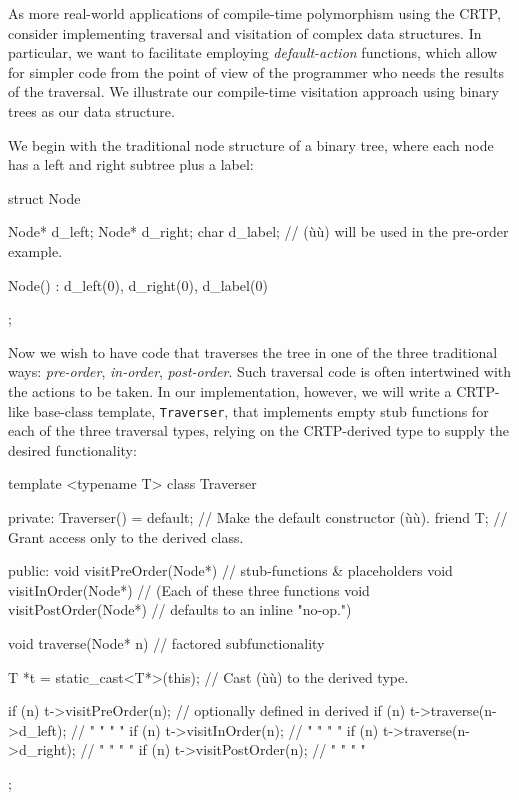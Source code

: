 As more real-world applications of compile-time polymorphism using the CRTP,
consider implementing traversal and visitation of complex data
structures. In particular, we want to facilitate employing
\emph{default-action} functions, which allow for simpler code from the
point of view of the programmer who needs the results of the traversal.
We illustrate our compile-time visitation approach using binary trees as
our data structure.

We begin with the traditional node structure of a binary tree, where
each node has a left and right subtree plus a label:

\begin{emcppslisting}[emcppsbatch=e9]
struct Node
{
    Node* d_left;
    Node* d_right;
    char  d_label;  // (ù{}ù) will be used in the pre-order example.

    Node() : d_left(0), d_right(0), d_label(0) { }
};
\end{emcppslisting}

\noindent Now we wish to have code that traverses the tree in one of the three
traditional ways: \emph{pre-order}, \emph{in-order}, \emph{post-order}.
Such traversal code is often intertwined with the actions to be taken.
In our implementation, however, we will write a CRTP-like base-class
template, \lstinline!Traverser!, that implements empty stub functions for
each of the three traversal types, relying on the CRTP-derived
type to supply the desired functionality:

\begin{emcppslisting}[emcppsbatch=e9]
template <typename T>
class Traverser
{
private:
    Traverser() = default;  // Make the default constructor (ù{}ù).
    friend T;               // Grant access only to the derived class.

public:
    void visitPreOrder(Node*)  { }  // stub-functions & placeholders
    void visitInOrder(Node*)   { }  // (Each of these three functions
    void visitPostOrder(Node*) { }  // defaults to an inline "no-op.")

    void traverse(Node* n)  // factored subfunctionality
    {
        T *t = static_cast<T*>(this);  // Cast (ù{}ù) to the derived type.

        if (n) { t->visitPreOrder(n);     }  // optionally defined in derived
        if (n) { t->traverse(n->d_left);  }  //     "         "    "     "
        if (n) { t->visitInOrder(n);      }  //     "         "    "     "
        if (n) { t->traverse(n->d_right); }  //     "         "    "     "
        if (n) { t->visitPostOrder(n);    }  //     "         "    "     "
    }
};
\end{emcppslisting}

